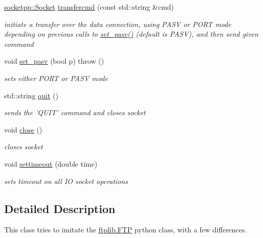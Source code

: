 \begin{CompactItemize}
\hyperlink{classsocketpp_1_1Socket}{socketpp::Socket} \hyperlink{classftplib_1_1FTP_e2c47d7a17f53916d81e0f1e289c9b7c}{transfercmd} (const std::string \&cmd)
\begin{CompactList}\small\item\em initiate a transfer over the data connection, using PASV or PORT mode depending on previous calls to \hyperlink{classftplib_1_1FTP_e35230239f093f01fb295ccb007de1b2}{set\_\-pasv()} (default is PASV), and then send given command \item\end{CompactList}\item 
void \hyperlink{classftplib_1_1FTP_e35230239f093f01fb295ccb007de1b2}{set\_\-pasv} (bool p)  throw ()
\begin{CompactList}\small\item\em sets either PORT or PASV mode \item\end{CompactList}\item 
std::string \hyperlink{classftplib_1_1FTP_bd6e018a5cc17b1c8007064830823c71}{quit} ()
\begin{CompactList}\small\item\em sends the 'QUIT' command and closes socket \item\end{CompactList}\item 
\hypertarget{classftplib_1_1FTP_4f36be9f23721435f19a7e5b1d702718}{
void \hyperlink{classftplib_1_1FTP_4f36be9f23721435f19a7e5b1d702718}{close} ()}
\label{classftplib_1_1FTP_4f36be9f23721435f19a7e5b1d702718}

\begin{CompactList}\small\item\em closes socket \item\end{CompactList}\item 
void \hyperlink{classftplib_1_1FTP_a6603cda3b7c44c48c6a2b8d688d3bb7}{settimeout} (double time)
\begin{CompactList}\small\item\em sets timeout on all IO socket operations \item\end{CompactList}\end{CompactItemize}


\subsection{Detailed Description}
This class tries to imitate the \hyperlink{classftplib_1_1FTP}{ftplib.FTP} python class, with a few differences. 

